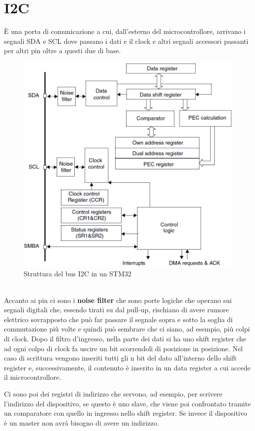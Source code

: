 \documentclass[12pt, a4paper]{report}
\begin{document}
\section{I2C}
È una porta di comunicazione a cui, dall'esterno del microcontrollore, arrivano i segnali SDA e SCL dove passano i dati e il clock e altri segnali accessori passanti per altri pin oltre a questi due di base.
\begin{figure}[h]
    \centering
    \includegraphics[scale=0.4,angle=0]{i2c_stm32.png}
    \caption{Struttura del bus I2C in un STM32}
\end{figure}
\\Accanto ai pin ci sono i \textbf{noise filter} che sono porte logiche che operano sui segnali digitali che, essendo tirati su dal pull-up, rischiano di avere rumore elettrico sovrapposto che può far passare il segnale sopra e sotto la soglia di commutazione più volte e quindi può sembrare che ci siano, ad esempio, più colpi di clock. Dopo il filtro d'ingresso, nella parte dei dati si ha uno shift register che ad ogni colpo di clock fa uscire un bit scorrendoli di posizione in posizione. Nel caso di scrittura vengono inseriti tutti gli n bit del dato all'interno dello shift register e, successivamente, il contenuto è inserito in un data register a cui accede il microcontrollore.

Ci sono poi dei registri di indirizzo che servono, ad esempio, per scrivere l'indirizzo del dispositivo, se questo è uno slave, che viene poi confrontato tramite un comparatore con quello in ingresso nello shift register. Se invece il dispositivo è un master non avrà bisogno di avere un indirizzo.
\end{document}

